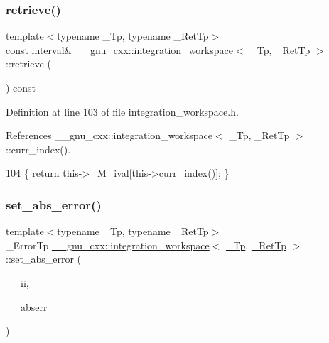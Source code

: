 \subsubsection{\texorpdfstring{retrieve()}{retrieve()}}
{\footnotesize\ttfamily template$<$typename \+\_\+\+Tp, typename \+\_\+\+Ret\+Tp$>$ \\
const interval\& \hyperlink{class____gnu__cxx_1_1integration__workspace}{\+\_\+\+\_\+gnu\+\_\+cxx\+::integration\+\_\+workspace}$<$ \hyperlink{namespace____gnu__cxx_a3b19a9c800ca194374ef9172290f7d79}{\+\_\+\+Tp}, \hyperlink{namespace____gnu__cxx_a886e03ece3d53ff7fa6c098a40f93fa5}{\+\_\+\+Ret\+Tp} $>$\+::retrieve (\begin{DoxyParamCaption}{ }\end{DoxyParamCaption}) const\hspace{0.3cm}{\ttfamily [inline]}}



Definition at line 103 of file integration\+\_\+workspace.\+h.



References \+\_\+\+\_\+gnu\+\_\+cxx\+::integration\+\_\+workspace$<$ \+\_\+\+Tp, \+\_\+\+Ret\+Tp $>$\+::curr\+\_\+index().


\begin{DoxyCode}
104       \{ \textcolor{keywordflow}{return} this->\_M\_ival[this->\hyperlink{class____gnu__cxx_1_1integration__workspace_a51a384b1777615943add69f1895454f5}{curr\_index}()]; \}
\end{DoxyCode}
\mbox{\label{class____gnu__cxx_1_1integration__workspace_a5e9f3a139e92add918968c6364e4a2b2}} 
\subsubsection{\texorpdfstring{set\+\_\+abs\+\_\+error()}{set\_abs\_error()}}
{\footnotesize\ttfamily template$<$typename \+\_\+\+Tp, typename \+\_\+\+Ret\+Tp$>$ \\
\+\_\+\+Error\+Tp \hyperlink{class____gnu__cxx_1_1integration__workspace}{\+\_\+\+\_\+gnu\+\_\+cxx\+::integration\+\_\+workspace}$<$ \hyperlink{namespace____gnu__cxx_a3b19a9c800ca194374ef9172290f7d79}{\+\_\+\+Tp}, \hyperlink{namespace____gnu__cxx_a886e03ece3d53ff7fa6c098a40f93fa5}{\+\_\+\+Ret\+Tp} $>$\+::set\+\_\+abs\+\_\+error (\begin{DoxyParamCaption}\item[{std\+::size\+\_\+t}]{\+\_\+\+\_\+ii,  }\item[{\+\_\+\+Error\+Tp}]{\+\_\+\+\_\+abserr }\end{DoxyParamCaption})\hspace{0.3cm}{\ttfamily [inline]}}

